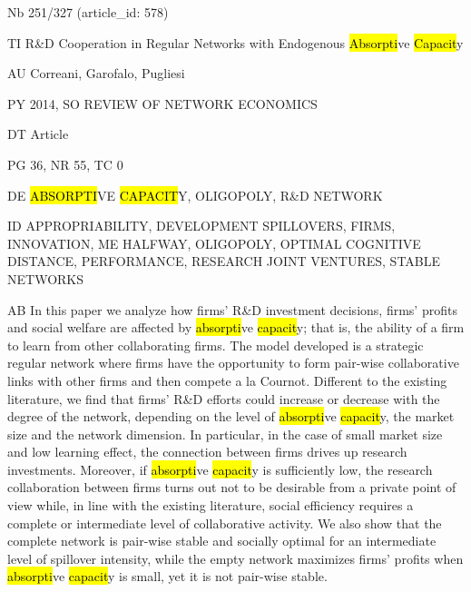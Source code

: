 \documentclass[a4paper]{article}
\begin{document}
\vspace*{-2cm}
Nb \tabto{0cm}251/327 (article\_id: 578)\par
TI \tabto{0cm}R\&D Cooperation in Regular Networks with Endogenous \hl{Absorpti}ve \hl{Capacit}y\par
AU \tabto{0cm}Correani, Garofalo, Pugliesi\par
PY \tabto{0cm}2014, SO REVIEW OF NETWORK ECONOMICS\par
DT \tabto{0cm}Article\par
PG \tabto{0cm}36, NR 55, TC 0\par
DE \tabto{0cm}\hl{ABSORPTI}VE \hl{CAPACIT}Y, OLIGOPOLY, R\&D NETWORK\par
ID \tabto{0cm}APPROPRIABILITY, DEVELOPMENT SPILLOVERS, FIRMS, INNOVATION, ME HALFWAY, OLIGOPOLY, OPTIMAL COGNITIVE DISTANCE, PERFORMANCE, RESEARCH JOINT VENTURES, STABLE NETWORKS\par
AB \tabto{0cm}In this paper we analyze how firms' R\&D investment decisions, firms' profits and social welfare are affected by \hl{absorpti}ve \hl{capacit}y; that is, the ability of a firm to learn from other collaborating firms. The model developed is a strategic regular network where firms have the opportunity to form pair-wise collaborative links with other firms and then compete a la Cournot. Different to the existing literature, we find that firms' R\&D efforts could increase or decrease with the degree of the network, depending on the level of \hl{absorpti}ve \hl{capacit}y, the market size and the network dimension. In particular, in the case of small market size and low learning effect, the connection between firms drives up research investments. Moreover, if \hl{absorpti}ve \hl{capacit}y is sufficiently low, the research collaboration between firms turns out not to be desirable from a private point of view while, in line with the existing literature, social efficiency requires a complete or intermediate level of collaborative activity. We also show that the complete network is pair-wise stable and socially optimal for an intermediate level of spillover intensity, while the empty network maximizes firms' profits when \hl{absorpti}ve \hl{capacit}y is small, yet it is not pair-wise stable.\par
\clearpage
\end{document}
